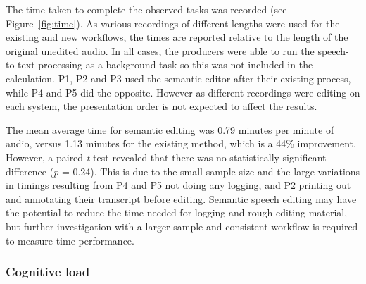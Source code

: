 The time taken to complete the observed tasks was recorded (see Figure~\ref{fig:time}). As various recordings of
different lengths were used for the existing and new workflows, the times are reported relative to the length of the
original unedited audio. In all cases, the producers were able to run the speech-to-text processing as a background
task so this was not included in the calculation. P1, P2 and P3 used the semantic editor after their existing process,
while P4 and P5 did the opposite. However as different recordings were editing on each system, the presentation order
is not expected to affect the results.

The mean average time for semantic editing was 0.79 minutes per minute of audio, versus 1.13 minutes for the existing
method, which is a 44\% improvement. However, a paired \textit{t}-test revealed that there was no statistically
significant difference (\textit{p} = 0.24).  This is due to the small sample size and the large variations in timings
resulting from P4 and P5 not doing any logging, and P2 printing out and annotating their transcript before editing.
Semantic speech editing may have the potential to reduce the time needed for logging and rough-editing material, but
further investigation with a larger sample and consistent workflow is required to measure time performance.




\subsubsection{Cognitive load}


